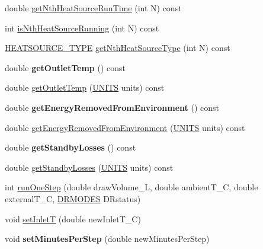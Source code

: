 \begin{DoxyCompactItemize}
\item 
double \hyperlink{class_h_p_w_h_add3696333342add793a2aeb5f3433dbd}{get\-Nth\-Heat\-Source\-Run\-Time} (int N) const 
\item 
int \hyperlink{class_h_p_w_h_a587a39a680823886348b489e85f243e9}{is\-Nth\-Heat\-Source\-Running} (int N) const 
\item 
\hyperlink{class_h_p_w_h_af01f392e3fff4013310d3fe992bb00bc}{H\-E\-A\-T\-S\-O\-U\-R\-C\-E\-\_\-\-T\-Y\-P\-E} \hyperlink{class_h_p_w_h_a0b5bc1354d20431d5e1f15e2c56ddefa}{get\-Nth\-Heat\-Source\-Type} (int N) const 
\item 
\hypertarget{class_h_p_w_h_af16099ea18a8c1c9f6025b7e2fc00e7e}{double {\bfseries get\-Outlet\-Temp} () const }\label{class_h_p_w_h_af16099ea18a8c1c9f6025b7e2fc00e7e}

\item 
double \hyperlink{class_h_p_w_h_a0b75a215e395f52d60997f9b07d37de7}{get\-Outlet\-Temp} (\hyperlink{class_h_p_w_h_a145320dbf116b9245ac4421026cff294}{U\-N\-I\-T\-S} units) const 
\item 
\hypertarget{class_h_p_w_h_a4ee36fec9eb6e1294ad200aeca2da87f}{double {\bfseries get\-Energy\-Removed\-From\-Environment} () const }\label{class_h_p_w_h_a4ee36fec9eb6e1294ad200aeca2da87f}

\item 
double \hyperlink{class_h_p_w_h_af58e48e9103fbb5525a251744816cc77}{get\-Energy\-Removed\-From\-Environment} (\hyperlink{class_h_p_w_h_a145320dbf116b9245ac4421026cff294}{U\-N\-I\-T\-S} units) const 
\item 
\hypertarget{class_h_p_w_h_ae615d088a390d0e1db95a196406ba2b4}{double {\bfseries get\-Standby\-Losses} () const }\label{class_h_p_w_h_ae615d088a390d0e1db95a196406ba2b4}

\item 
double \hyperlink{class_h_p_w_h_a5cccd4667bf976b0a6c1d33ce5fec880}{get\-Standby\-Losses} (\hyperlink{class_h_p_w_h_a145320dbf116b9245ac4421026cff294}{U\-N\-I\-T\-S} units) const 
\item 
int \hyperlink{class_h_p_w_h_a68a687d987105c10a17bac1a94be5224}{run\-One\-Step} (double draw\-Volume\-\_\-\-L, double ambient\-T\-\_\-\-C, double external\-T\-\_\-\-C, \hyperlink{class_h_p_w_h_a6a74814715ed6a33a75fd0d9dc3e7107}{D\-R\-M\-O\-D\-E\-S} D\-Rstatus)
\item 
void \hyperlink{class_h_p_w_h_a5df4fd4422ba54080f519aaf6375be32}{set\-Inlet\-T} (double new\-Inlet\-T\-\_\-\-C)
\item 
\hypertarget{class_h_p_w_h_a5752aa0b3488189c7321c174887f1c31}{void {\bfseries set\-Minutes\-Per\-Step} (double new\-Minutes\-Per\-Step)}\label{class_h_p_w_h_a5752aa0b3488189c7321c174887f1c31}

\end{DoxyCompactItemize}
